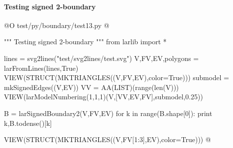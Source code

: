 \documentclass[11pt,oneside]{article}    %
\begin{document}
\paragraph{Testing signed 2-boundary}
@O test/py/boundary/test13.py
@{""" Testing signed 2-boundary """
from larlib import *

lines = svg2lines("test/svg2lines/test.svg")
V,FV,EV,polygons = larFromLines(lines,True)
VIEW(STRUCT(MKTRIANGLES((V,FV,EV),color=True)))
submodel = mkSignedEdges((V,EV))
VV = AA(LIST)(range(len(V)))
VIEW(larModelNumbering(1,1,1)(V,[VV,EV,FV],submodel,0.25))

B = larSignedBoundary2(V,FV,EV)
for k in range(B.shape[0]):
    print k,B.todense()[k]

VIEW(STRUCT(MKTRIANGLES((V,FV[1:3],EV),color=True)))
@}
\end{document}
